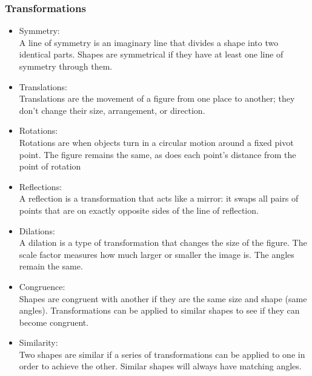 \documentclass[11pt, fleqn]{article}
\begin{document}
\subsubsection{Transformations}
\begin{itemize}
    \item Symmetry:\\
    A line of symmetry is an imaginary line that divides a shape into two identical parts. Shapes are symmetrical if they have at least one line of symmetry through them.
    \item Translations:\\
    Translations are the movement of a figure from one place to another; they don't change their size, arrangement, or direction.
    \item Rotations:\\
    Rotations are when objects turn in a circular motion around a fixed pivot point. The figure remains the same, as does each point's distance from the point of rotation
    \item Reflections:\\
    A reflection is a transformation that acts like a mirror: it swaps all pairs of points that are on exactly opposite sides of the line of reflection.
    \item Dilations:\\
    A dilation is a type of transformation that changes the size of the figure. The scale factor measures how much larger or smaller the image is. The angles remain the same.
    \item Congruence:\\
    Shapes are congruent with another if they are the same size and shape (same angles). Transformations can be applied to similar shapes to see if they can become congruent.
    \item Similarity:\\
    Two shapes are similar if a series of transformations can be applied to one in order to achieve the other. Similar shapes will always have matching angles.
\end{itemize}
\end{document}
